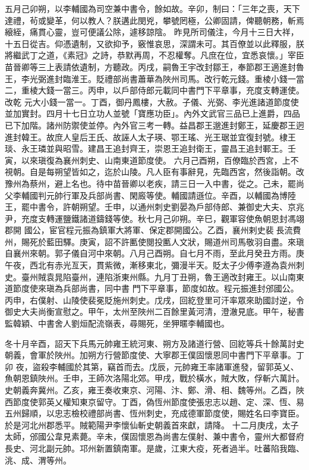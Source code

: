 \begin{pinyinscope}
 五月己卯朔，以李輔國為司空兼中書令，餘如故。辛卯，制曰：「三年之喪，天下達禮，茍或變革，何以教人？朕遘此閔兇，攀號罔極，公卿固請，俾聽朝務，斬焉縗絰，痛貫心靈，豈可便議公除，遽移諒陰。
 昨見所司儀注，今月十三日大祥，十五日從吉。仰憑遺制，又欲抑予，竅惟哀思，深謂未可。其百僚並以此釋服，朕將繼武丁之道，《素冠》之詩，恭默再周，不忍權奪。凡庶在位，宜悉哀懷。」宰臣苗晉卿等三上表請依遺制，方聽政。丙戌，嗣魯王宇改封鄒王，奉節郡王適進封魯王，李光弼進封臨淮王。貶禮部尚書蕭華為陜州司馬。改行乾元錢。重棱小錢一當二，重棱大錢一當三。丙申，以戶部侍郎元載同中書門下平章事，充度支轉運使。改乾
 元大小錢一當一。丁酉，御丹鳳樓，大赦。子儀、光弼、李光進諸道節度使並加實封。四月十七日立功人並號「寶應功臣」。內外文武官三品已上進爵，四品已下加階。諸州防禦使並停。內外官三考一轉。益昌郡王邈進封鄭王，延慶郡王迥進封韓王。故庶人皇后王氏、故誣人太子瑛、鄂王瑤、光王琚並宜復封號。棣王琰、永王璘並與昭雪。建昌王追封齊王，崇恩王追封衛王，靈昌王追封鄆王。壬寅，以來瑱復為襄州刺史、山南東道節度使。
 六月己酉朔，百僚臨於西宮，上不視朝。自是每朔望皆如之，迄於山陵。凡人臣有事辭見，先臨西宮，然後詣朝。改豫州為蔡州，避上名也。待中苗晉卿以老疾，請三日一入中書，從之。己未，罷尚父李輔國判元帥行軍及兵部尚書、閑廄等使。輔國請遜位。辛酉，以輔國為博陸王，罷中書令，許朝朔望。壬申，以通州刺史劉晏為戶部侍郎、兼御史大夫、京兆尹，充度支轉運鹽鐵諸道鑄錢等使。秋七月己卯朔。辛巳，觀軍容使魚朝恩封馮翊郡開
 國公，宦官程元振為鎮軍大將軍、保定郡開國公。乙酉，襄州剌史裴長流費州，賜死於藍田驛。庚寅，詔不許匭使閱投匭人文狀，賜道州司馬敬羽自盡。來瑱自襄州來朝。郭子儀自河中來朝。八月己酉朔。自七月不雨，至此月癸丑方雨。庚午夜，西北有赤光亙天，貫紫微，漸移東北，彌漫半天。貶太子少傅李遵為袁州刺史。臺州賊袁晁陷臺州，連陷浙東州縣。九月丁丑朔，魯王適改封雍王。以山南東道節度使來瑱為兵部尚書，同中書
 門下平章事，節度如故。程元振進封邠國公。丙申，右僕射、山陵使裴冕貶施州刺史。戊戌，回紇登里可汗率眾來助國討逆，令御史大夫尚衡宣慰之。甲午，太州至陜州二百餘里黃河清，澄澈見底。甲午，秘書監韓穎、中書舍人劉烜配流嶺表，尋賜死，坐狎暱李輔國也。



 冬十月辛酉，詔天下兵馬元帥雍王統河東、朔方及諸道行營、回紇等兵十餘萬討史朝義，會軍於陜州。加朔方行營節度使、大寧郡王僕固懷恩同中書門下平章事。丁卯
 夜，盜殺李輔國於其第，竊首而去。戊辰，元帥雍王率諸軍進發，留郭英乂、魚朝恩鎮陜州。壬申，王師次洛陽北郊。甲戌，戰於橫水，賊大敗，俘斬六萬計。史朝義奔冀州。乙亥，雍王奏收東京、河陽、汴、鄭、滑、相、魏等州。乙酉，陜西節度使郭英乂權知東京留守。丁酉，偽恆州節度使張忠志以趙、定、深、恆、易五州歸順，以忠志檢校禮部尚書、恆州刺史，充成德軍節度使，賜姓名曰李寶臣。於是河北州郡悉平。賊範陽尹李懷仙斬史朝義首來獻，請降。
 十二月庚戌，太子太師，邠國公韋見素薨。辛未，僕固懷恩為尚書左僕射、兼中書令，靈州大都督府長史、河北副元帥。邛州新置鎮南軍。是歲，江東大疫，死者過半。吐蕃陷我臨、洮、成、渭等州。




\end{pinyinscope}
